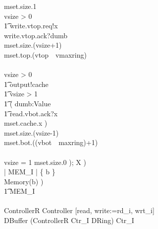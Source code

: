\documentclass{llncs}
\begin{document}
\begin{circus}
                                        mset.size.1 \then \Skip \\
                                    \extchoice \lcircguard vsize > 0 \rcircguard \circguard \\
                                    \t1 write.vtop.req!x \then \\
                                        write.vtop.ack?dumb \then \\
                                        mset.size.(vsize+1) \then \\
                                        mset.top.(vtop~\mod~vmaxring) \then \\
                                        \Skip
                                                                                                                \\
                            \extchoice
                            \lcircguard vsize > 0 \rcircguard \circguard \\
                            \t1 output!cache \then \\
                                \t1 \lcircguard vsize > 1 \rcircguard \circguard \\
                                    \t1 ( \IntChoice dumb:Value \circspot \\
                                            \t1 read.vbot.ack?x \then \\
                                                mset.cache.x \then \Skip )\Semi\ \\
                                        mset.size.(vsize-1) \then \\
                                        mset.bot.((vbot~\mod~maxring)+1) \then \\
                                        \Skip
                                                                    \\
                                    \extchoice \lcircguard vsize = 1 \rcircguard \circguard 
                                        mset.size.0 \then \Skip ); X
                ) \\
                \lpar \emptyset | MEM_I | \{ b \} \rpar \\
                Memory(b)
            ) \\
            \t1 \circhide MEM_I
        \\
    \circend
    \\
    \circusprocess ControllerR \circdef Controller [read, write:=rd\_i, wrt\_i]
    \\
    \circusprocess DBuffer \circdef (ControllerR \lpar Ctr_I \rpar DRing) \circhide Ctr_I
\end{circus}%
\end{document}
